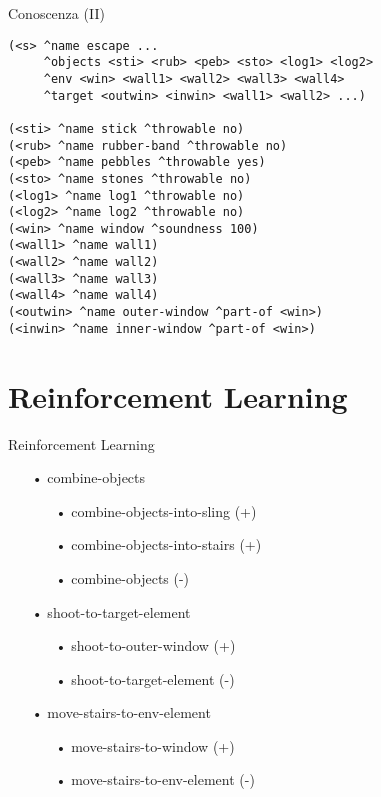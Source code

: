 \documentclass{beamer}
\begin{document}
    \begin{frame}[fragile]{Conoscenza (II)}
        \begin{lstlisting}[frame=single]
(<s> ^name escape ...
     ^objects <sti> <rub> <peb> <sto> <log1> <log2>
     ^env <win> <wall1> <wall2> <wall3> <wall4>
     ^target <outwin> <inwin> <wall1> <wall2> ...)

(<sti> ^name stick ^throwable no)
(<rub> ^name rubber-band ^throwable no)
(<peb> ^name pebbles ^throwable yes)
(<sto> ^name stones ^throwable no)
(<log1> ^name log1 ^throwable no)
(<log2> ^name log2 ^throwable no)
(<win> ^name window ^soundness 100)
(<wall1> ^name wall1)
(<wall2> ^name wall2)
(<wall3> ^name wall3)
(<wall4> ^name wall4)
(<outwin> ^name outer-window ^part-of <win>)
(<inwin> ^name inner-window ^part-of <win>)
        \end{lstlisting}
    \end{frame}

    \section{Reinforcement Learning}

    \begin{frame}{Reinforcement Learning}
        \begin{itemize}
            \item[•] combine-objects
                \begin{itemize}
                    \item[•] combine-objects-into-sling (+)
                    \item[•] combine-objects-into-stairs (+)
                    \item[•] combine-objects (-)
                \end{itemize}
            \item[•] shoot-to-target-element
                \begin{itemize}
                    \item[•] shoot-to-outer-window (+)
                    \item[•] shoot-to-target-element (-)
                \end{itemize}
            \item[•] move-stairs-to-env-element
                \begin{itemize}
                    \item[•] move-stairs-to-window (+)
                    \item[•] move-stairs-to-env-element (-)
                \end{itemize}
        \end{itemize}
    \end{frame}
\end{document}
